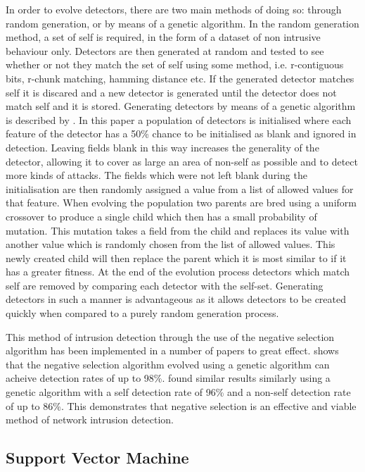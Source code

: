 	In order to evolve detectors, there are two main methods of doing so: through random generation, or by means of a genetic algorithm. In the random generation method, a set of self is required, in the form of a dataset of non intrusive behaviour only. Detectors are then generated at random and tested to see whether or not they match the set of self using some method, i.e. r-contiguous bits, r-chunk matching, hamming distance etc. If the generated detector matches self it is discared and a new detector is generated until the detector does not match self and it is stored. Generating detectors by means of a genetic algorithm is described by \cite{powers2008hybrid}. In this paper a population of detectors is initialised where each feature of the detector has a 50\% chance to be initialised as blank and ignored in detection. Leaving fields blank in this way increases the generality of the detector, allowing it to cover as large an area of non-self as possible and to detect more kinds of attacks. The fields which were not left blank during the initialisation are then randomly assigned a value from a list of allowed values for that feature. When evolving the population two parents are bred using a uniform crossover to produce a single child which then has a small probability of mutation. This mutation takes a field from the child and replaces its value with another value which is randomly chosen from the list of allowed values. This newly created child will then replace the parent which it is most similar to if it has a greater fitness. At the end of the evolution process detectors which match self are removed by comparing each detector with the self-set. Generating detectors in such a manner is advantageous as it allows detectors to be created quickly when compared to a purely random generation process.
	
	This method of intrusion detection through the use of the negative selection algorithm has been implemented in a number of papers to great effect. \cite{powers2008hybrid} shows that the negative selection algorithm evolved using a genetic algorithm can acheive detection rates of up to 98\%. \cite{dasgupta2002immunity} found similar results similarly using a genetic algorithm with a self detection rate of 96\% and a non-self detection rate of up to 86\%. This demonstrates that negative selection is an effective and viable method of network intrusion detection.
	
\subsection{Support Vector Machine}

